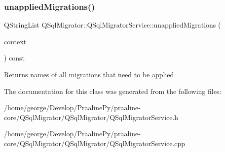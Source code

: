 \subsubsection{\texorpdfstring{unapplied\+Migrations()}{unappliedMigrations()}}
{\footnotesize\ttfamily Q\+String\+List Q\+Sql\+Migrator\+::\+Q\+Sql\+Migrator\+Service\+::unapplied\+Migrations (\begin{DoxyParamCaption}\item[{const \hyperlink{class_q_sql_migrator_1_1_migration_execution_1_1_migration_execution_context}{Migration\+Execution\+::\+Migration\+Execution\+Context} \&}]{context }\end{DoxyParamCaption}) const}

\begin{DoxyReturn}{Returns}
names of all migrations that need to be applied 
\end{DoxyReturn}


The documentation for this class was generated from the following files\+:\begin{DoxyCompactItemize}
\item 
/home/george/\+Develop/\+Praaline\+Py/praaline-\/core/\+Q\+Sql\+Migrator/\+Q\+Sql\+Migrator/Q\+Sql\+Migrator\+Service.\+h\item 
/home/george/\+Develop/\+Praaline\+Py/praaline-\/core/\+Q\+Sql\+Migrator/\+Q\+Sql\+Migrator/Q\+Sql\+Migrator\+Service.\+cpp\end{DoxyCompactItemize}
